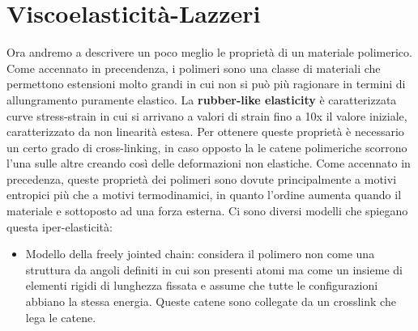 \section{Viscoelasticità-Lazzeri}
Ora andremo a descrivere un poco meglio le proprietà di un materiale polimerico.
Come accennato in precendenza, i polimeri sono una classe di materiali che permettono estensioni molto grandi in cui non si può più ragionare in termini di allungramento puramente elastico. La \textbf{rubber-like elasticity} è caratterizzata curve stress-strain in cui si arrivano a valori di strain fino a 10x il valore iniziale, caratterizzato da non linearità estesa. Per ottenere queste proprietà è necessario un certo grado di cross-linking, in caso opposto la le catene polimeriche scorrono l'una sulle altre creando così delle deformazioni non elastiche.
Come accennato in precedenza, queste proprietà dei polimeri sono dovute principalmente a motivi entropici più che a motivi termodinamici, in quanto l'ordine aumenta quando il materiale e sottoposto ad una forza esterna.
Ci sono diversi modelli che spiegano questa iper-elasticità:
\begin{itemize}
    \item Modello della freely jointed chain: considera il polimero non come una struttura da angoli definiti in cui son presenti atomi ma come un insieme di elementi rigidi di lunghezza fissata e assume che tutte le configurazioni abbiano la stessa energia. Queste catene sono collegate da un crosslink che lega le catene.
\end{itemize}